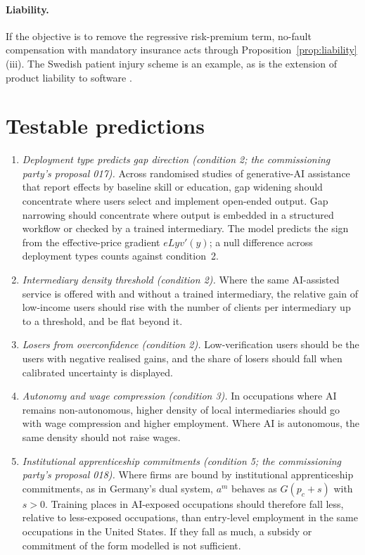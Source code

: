 \documentclass[12pt]{article}
\theoremstyle{remark}
\begin{document}
\paragraph{Liability.} If the objective is to remove the regressive risk-premium term, no-fault compensation with mandatory insurance acts through Proposition~\ref{prop:liability}(iii). The Swedish patient injury scheme \citep{sweden1996patient} is an example, as is the extension of product liability to software \citep{eu2024pld}.

\section{Testable predictions}\label{sec:predictions}

\begin{enumerate}[label=P\arabic*.,leftmargin=2.5em]
\item \emph{Deployment type predicts gap direction (condition 2; the commissioning party's proposal 017).} Across randomised studies of generative-AI assistance that report effects by baseline skill or education, gap widening should concentrate where users select and implement open-ended output. Gap narrowing should concentrate where output is embedded in a structured workflow or checked by a trained intermediary. The model predicts the sign from the effective-price gradient $eLyv'(y)$; a null difference across deployment types counts against condition~2.
\item \emph{Intermediary density threshold (condition 2).} Where the same AI-assisted service is offered with and without a trained intermediary, the relative gain of low-income users should rise with the number of clients per intermediary up to a threshold, and be flat beyond it.
\item \emph{Losers from overconfidence (condition 2).} Low-verification users should be the users with negative realised gains, and the share of losers should fall when calibrated uncertainty is displayed.
\item \emph{Autonomy and wage compression (condition 3).} In occupations where AI remains non-autonomous, higher density of local intermediaries should go with wage compression and higher employment. Where AI is autonomous, the same density should not raise wages.
\item \emph{Institutional apprenticeship commitments (condition 5; the commissioning party's proposal 018).} Where firms are bound by institutional apprenticeship commitments, as in Germany's dual system, $a^m$ behaves as $G(p_c+s)$ with $s>0$. Training places in AI-exposed occupations should therefore fall less, relative to less-exposed occupations, than entry-level employment in the same occupations in the United States. If they fall as much, a subsidy or commitment of the form modelled is not sufficient.

\end{enumerate}
\end{document}
